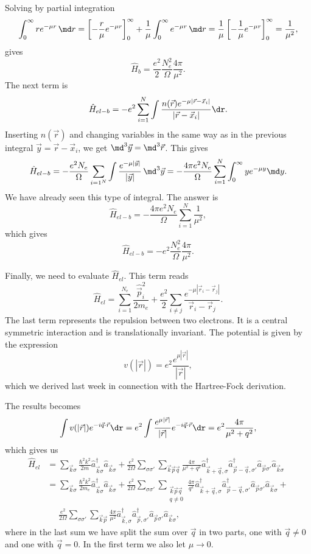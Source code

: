 Solving by partial integration
\[ \int_0^\infty re^{-\mu r} \, \md r = \left[ -\frac{r}{\mu} e^{-\mu r} \right]_0^\infty + \frac{1}{\mu} \int_0^\infty e^{-\mu r} \, \md r
%
= \frac{1}{\mu} \left[ - \frac{1}{\mu} e^{-\mu r} \right]_0^\infty = \frac{1}{\mu^2}, \]
%
gives
\[
\hat H_b = \frac{e^2}{2} \frac{N_e^2}{\Omega} \frac{4\pi}{\mu^2} .
\]
%
The next term is 
\[ \hat H_{el-b} = -e^2 \sum_{i = 1}^N \int \frac{n(\vec r) e^{-\mu |\vec r - \vec x_i|}}{|\vec r - \vec x_i|} \dr . \]
%
Inserting  $n(\vec r)$ and changing variables in the same way as in the previous integral $\vec y = \vec r - \vec x_i$, we get $\md^3 \vec y = \md^3 \vec r$. This gives
\[ \hat H_{el-b} = -\frac{e^2 N_e}{\Omega} \sum_{i = 1^N} \int \frac{e^{-\mu |\vec y|}}{|\vec y|} \, \md^3 \vec y
%
=  -\frac{4\pi e^2 N_e}{\Omega} \sum_{i = 1}^N \int_0^\infty y e^{-\mu y} \md y. \]
%
We have already seen this  type of integral. The answer is 
\[ \hat H_{el-b} = -\frac{4\pi e^2 N_e}{\Omega} \sum_{i = 1}^N \frac{1}{\mu^2}, \]
which gives
\[
\hat H_{el-b} = -e^2 \frac{N_e^2}{\Omega} \frac{4\pi}{\mu^2} .
\]

Finally, we need to evaluate $\hat H_{el}$. This term reads
\[ \hat H_{el} = \sum_{i=1}^{N_e} \frac{\hat{\vec p}_i^2}{2m_e} + \frac{e^2}{2} \sum_{i \neq j} \frac{e^{-\mu |\vec r_i - \vec r_j|}}{\vec r_i - \vec r_j} . \]
%
The last term represents the repulsion between two electrons. It is a central symmetric interaction
and is translationally invariant. The potential is given by the expression
\[ v(|\vec r|) = e^2 \frac{e^{\mu|\vec r|}}{|\vec r|}, \]
which we derived last week in connection with the Hartree-Fock derivation.

The results becomes
\[ \int v(|\vec r|) e^{-i \vec q \cdot \vec r} \dr =
e^2 \int \frac{e^{\mu |\vec r|}}{|\vec r|} e^{-i \vec q \cdot \vec r} \dr =
e^2 \frac{4\pi}{\mu^2 + q^2} , \]
%
which gives us
\begin{align*}
\hat H_{el} &= \sum_{\vec k \sigma} \frac{\hbar^2 k^2}{2m} \hat a_{\vec k \sigma}^\dagger \hat a_{\vec k \sigma} +
\frac{e^2}{2\Omega} \sum_{\sigma \sigma'} \sum_{\vec k \vec p \vec q} \frac{4\pi}{\mu^2 + q^2}
\hat a_{\vec k + \vec q, \sigma}^\dagger \hat a_{\vec p - \vec q, \sigma'}^\dagger \hat a_{\vec p \sigma'} \hat a_{\vec k \sigma} \\
%
&= \sum_{\vec k \sigma} \frac{\hbar^2 k^2}{2m_e} \hat a_{\vec k \sigma}^\dagger \hat a_{\vec k \sigma} +
\frac{e^2}{2\Omega} \sum_{\sigma \sigma'} \sum_{\substack{\vec k \vec p \vec q \\ q \neq 0}} \frac{4\pi}{q^2}
\hat a_{\vec k + \vec q, \sigma}^\dagger \hat a_{\vec p - \vec q, \sigma'}^\dagger \hat a_{\vec p \sigma'} \hat a_{\vec k \sigma} + \\
&\quad\,\,
\frac{e^2}{2\Omega} \sum_{\sigma \sigma'} \sum_{\vec k \vec p} \frac{4\pi}{\mu^2}
\hat a_{\vec k, \sigma}^\dagger \hat a_{\vec p, \sigma'}^\dagger \hat a_{\vec p \sigma'} \hat a_{\vec k \sigma} ,
\end{align*}
%
where in the last sum we have split the sum over $\vec q$ in two parts, one with $\vec q\ne 0$ and one with 
$\vec q=0$. In the first term we also let $\mu\rightarrow 0$.


